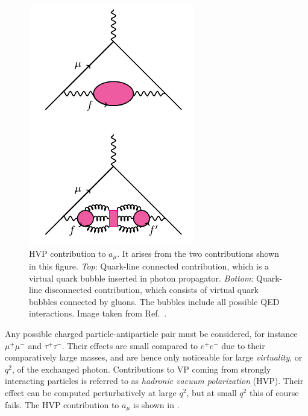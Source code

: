 \begin{figure}
\centering
\includegraphics[width=0.8\linewidth]{figs/HVP.pdf}
\caption{HVP contribution to $a_\mu$. It arises from the two
contributions shown in this figure. {\it Top}: Quark-line
connected contribution, which is a virtual quark
bubble inserted in photon propagator. {\it Bottom}:
Quark-line disconnected contribution, which consists of
virtual quark bubbles connected by gluons. The bubbles
include all possible QED interactions.
Image taken from Ref.~\cite{FermilabLattice:2022izv}.}
\label{fig:HVPmuon}
\end{figure}


Any possible charged particle-antiparticle pair must be considered,
for instance $\mu^+\mu^-$ and $\tau^+\tau^-$. Their effects are small compared
to $e^+e^-$ due to their comparatively large masses, and are hence
only noticeable for large {\it virtuality}, or $q^2$,
of the exchanged photon. 
Contributions to VP coming from strongly interacting particles
is referred to as 
{\it hadronic vacuum polarization} (HVP).
Their effect can be computed perturbatively at large $q^2$,
but at small $q^2$ this of course fails.
The HVP contribution to $a_\mu$ is shown in .

